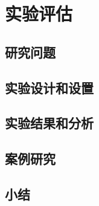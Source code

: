 \chapter{实验评估}



\section{研究问题}


\section{实验设计和设置}


\section{实验结果和分析}


\section{案例研究}


\section{小结}
